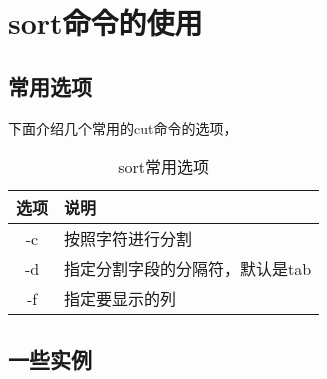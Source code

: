 \section{sort命令的使用}
\label{sec:sortCmd}

\subsection{常用选项}
\label{subsec:sortOptions}

下面介绍几个常用的cut命令的选项，

\begin{table}[htbp]
  \centering
    \caption{sort常用选项}
    \label{tab:sortSomeOpts}
    \begin{tabular}{cl}
      \toprule
      选项     & 说明 \\
      \midrule
      -c        & 按照字符进行分割 \\
      -d        & 指定分割字段的分隔符，默认是tab \\
      -f        & 指定要显示的列 \\
      \bottomrule
    \end{tabular}
\end{table}

\subsection{一些实例}
\label{subsec:sortInstances}